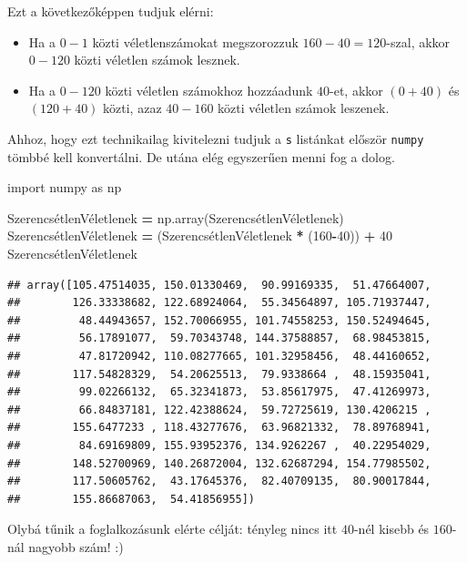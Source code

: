 \documentclass[
]{book}
\newenvironment{Shaded}{\begin{snugshade}}{\end{snugshade}}
\newcommand{\DecValTok}[1]{\textcolor[rgb]{0.00,0.00,0.81}{#1}}
\newcommand{\ImportTok}[1]{#1}
\newcommand{\NormalTok}[1]{#1}
\newcommand{\OperatorTok}[1]{\textcolor[rgb]{0.81,0.36,0.00}{\textbf{#1}}}
\providecommand{\tightlist}{%
  \setlength{\itemsep}{0pt}\setlength{\parskip}{0pt}}
\begin{document}
Ezt a következőképpen tudjuk elérni:

\begin{itemize}
\tightlist
\item
  Ha a \(0-1\) közti véletlenszámokat megszorozzuk \(160-40=120\)-szal, akkor \(0-120\) közti véletlen számok lesznek.
\item
  Ha a \(0-120\) közti véletlen számokhoz hozzáadunk \(40\)-et, akkor \((0+40)\) és \((120+40)\) közti, azaz \(40-160\) közti véletlen számok leszenek.
\end{itemize}

Ahhoz, hogy ezt technikailag kivitelezni tudjuk a \texttt{s} listánkat először \texttt{numpy} tömbbé kell konvertálni. De utána elég egyszerűen menni fog a dolog.

\begin{Shaded}
\begin{Highlighting}[]
\ImportTok{import}\NormalTok{ numpy }\ImportTok{as}\NormalTok{ np}

\NormalTok{SzerencsétlenVéletlenek }\OperatorTok{=}\NormalTok{ np.array(SzerencsétlenVéletlenek)}
\NormalTok{SzerencsétlenVéletlenek }\OperatorTok{=}\NormalTok{ (SzerencsétlenVéletlenek }\OperatorTok{*}\NormalTok{ (}\DecValTok{160}\OperatorTok{{-}}\DecValTok{40}\NormalTok{)) }\OperatorTok{+} \DecValTok{40}
\NormalTok{SzerencsétlenVéletlenek}
\end{Highlighting}
\end{Shaded}

\begin{verbatim}
## array([105.47514035, 150.01330469,  90.99169335,  51.47664007,
##        126.33338682, 122.68924064,  55.34564897, 105.71937447,
##         48.44943657, 152.70066955, 101.74558253, 150.52494645,
##         56.17891077,  59.70343748, 144.37588857,  68.98453815,
##         47.81720942, 110.08277665, 101.32958456,  48.44160652,
##        117.54828329,  54.20625513,  79.9338664 ,  48.15935041,
##         99.02266132,  65.32341873,  53.85617975,  47.41269973,
##         66.84837181, 122.42388624,  59.72725619, 130.4206215 ,
##        155.6477233 , 118.43277676,  63.96821332,  78.89768941,
##         84.69169809, 155.93952376, 134.9262267 ,  40.22954029,
##        148.52700969, 140.26872004, 132.62687294, 154.77985502,
##        117.50605762,  43.17645376,  82.40709135,  80.90017844,
##        155.86687063,  54.41856955])
\end{verbatim}

Olybá tűnik a foglalkozásunk elérte célját: tényleg nincs itt \(40\)-nél kisebb és \(160\)-nál nagyobb szám! :)
\end{document}
